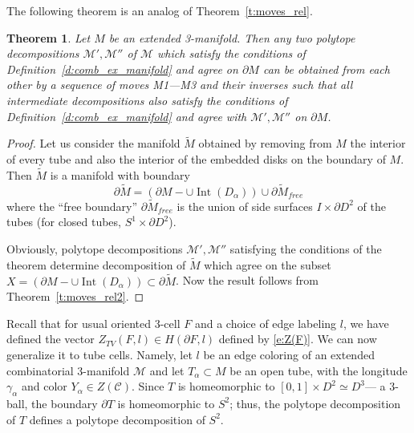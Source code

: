 \documentclass{amsart}
\newtheorem{theorem}{Theorem}[section]
\theoremstyle{definition}
\theoremstyle{remark}
\numberwithin{equation}{section}
\newcommand{\thref}[1]{Theorem~{\rm\ref{#1}}}
\newcommand{\deref}[1]{Definition~{\rm\ref{#1}}}
\newcommand{\del}{\partial}
\newcommand{\<}{\langle}
\renewcommand{\>}{\rangle}
\newcommand{\C}{\mathcal{C}}      %
\newcommand{\M}{\mathcal{M}}      %
\newcommand{\al}{\alpha}
\newcommand{\ga}{\gamma}
\DeclareMathOperator{\Int}{Int}
\begin{document}
The following theorem is an analog of \thref{t:moves_rel}.

\begin{theorem}\label{t:moves_ext}
 Let $M$ be an extended 3-manifold. Then any two polytope decompositions
$\M', \M''$ of $\M$ which satisfy the conditions of
\deref{d:comb_ex_manifold} and agree on $\del M$ can be obtained  from
each other by a sequence of moves M1---M3 and their inverses such that all
intermediate decompositions also satisfy the conditions of
\deref{d:comb_ex_manifold} and agree with $\M', \M''$ on $\del M$.
\end{theorem}
\begin{proof}
Let us consider the manifold $\tilde M$ obtained by removing from $M$ the
interior of every tube and also the interior of the embedded disks on the
boundary of $M$. Then $\tilde M$ is a manifold with boundary
$$
\del \tilde M=(\del M-\cup \Int(D_\al))\cup \del \tilde M_{free}
$$
where the ``free boundary'' $\del \tilde M_{free}$ is the union of side
surfaces $I\times \del D^2$ of the tubes (for closed tubes, $S^1\times
\del D^2$).

Obviously, polytope decompositions $\M', \M''$ satisfying the conditions
of the theorem determine decomposition of $\tilde M$ which agree on the
subset $X=(\del M-\cup \Int(D_\al))\subset \del \tilde M$. Now the result
follows from \thref{t:moves_rel2}.
\end{proof}




Recall that for usual oriented  3-cell $F$ and a choice of edge labeling
$l$, we have defined the vector $Z_{TV}(F,l)\in H(\del
F,l)$ defined by \eqref{e:Z(F)}. We can now generalize it to tube
cells. Namely, let $l$ be an edge coloring of an extended
combinatorial 3-manifold $\M$ and let $T_\al\subset M$ be an open tube,
with the longitude $\ga_\al$ and color $Y_\al\in Z(\C)$. Since $T$ is
homeomorphic to $[0,1]\times D^2\simeq D^3$--- a 3-ball, the boundary
$\del T$ is homeomorphic to $S^2$; thus, the polytope
 decomposition of $T$ defines a polytope decomposition of $S^2$. 
\end{document}
